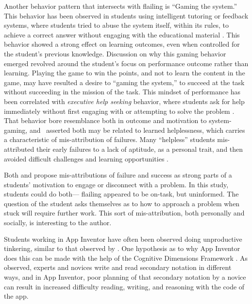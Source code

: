 Another behavior pattern that intersects with flailing is ``Gaming the system.'' This behavior has been observed in students using intelligent tutoring or feedback systems, where students tried to abuse the system itself, within its rules, to achieve a correct answer without engaging with the educational material \citep{baker2004off}. This behavior showed a strong effect on learning outcomes, even when controlled for the student's previous knowledge. Discussion on why this gaming behavior emerged revolved around the student's focus on performance outcome rather than learning. Playing the game to win the points, and not to learn the content in the game, may have resulted a desire to ``gaming the system,'' to succeed at the task without succeeding in the mission of the task. This mindset of performance has been correlated with \emph{executive help seeking} behavior, where students ask for help immediately without first engaging with or attempting to solve the problem \citep{arbreton1998student}. That behavior bore resemblance both in outcome and motivation to system-gaming, and \citeauthor{baker2004off}~asserted both may be related to learned helplessness, which carries a characteristic of mis-attribution of failures. Many ``helpless'' students mis-attributed their early failures to a lack of aptitude, as a personal trait, and then avoided difficult challenges and learning opportunities \citep{dweck1988social}. 

Both \citeauthor{wilson-2002} and \citeauthor{baker2004off} propose mis-attributions of failure and success as strong parts of a students' motivation to engage or disconnect with a problem. In this study, students could do both--- flailing appeared to be on-task, but uninformed. The question of the student asks themselves as to how to approach a problem when stuck will require further work. This sort of mis-attribution, both personally and socially, is interesting to the author.

Students working in App Inventor have often been observed doing unproductive tinkering, similar to that observed by \citet{perkins-1986}. One hypothesis as to why App Inventor does this can be made with the help of the Cognitive Dimensions Framework \citep{blackwell-2003}. As \citet{petre-2006} observed, experts and novices write and read secondary notation in different ways, and in App Inventor, poor planning of that secondary notation by a novice can result in increased difficulty reading, writing, and reasoning with the code of the app. 


